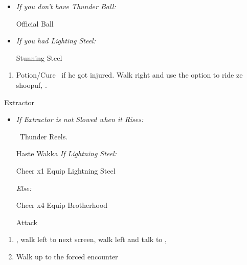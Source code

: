 \begin{equip}
    \begin{itemize}
        \item \textit{If you don't have Thunder Ball:}
        \begin{itemize}
            \wakkaf Official Ball
        \end{itemize}
        \item \textit{If you had Lighting Steel:}
        \begin{itemize}
            \tidusf Stunning Steel
        \end{itemize}
    \end{itemize}
\end{equip}
\begin{enumerate}[resume]
    \item Potion/Cure \tidus\ if he got injured. Walk right and use the  option to ride ze shoopuf, \sd.
\end{enumerate}
\winvfill\lossvfill
\begin{battle}[4000]{Extractor}
    \begin{itemize}
        \tidusf Haste self
        \wakkaf Attack
        \tidusf Attack Extractor until you apply Slow
        \item \textit{If Extractor is not Slowed when it Rises:}
        \begin{itemize}
            \wakkaf \od\ Thunder Reels.
        \end{itemize}
        \tidusf Haste Wakka
        \textit{If Lightning Steel:}
        \begin{itemize}
            \tidusf Cheer x1
            \tidusf Equip Lightning Steel
        \end{itemize}
        \textit{Else:}
        \begin{itemize}
            \tidusf Cheer x4
            \tidusf Equip Brotherhood
        \end{itemize}
        \tidusf Attack
    \end{itemize}
\end{battle}
\begin{enumerate}[resume]
    \item \sd, walk left to next screen, walk left and talk to \rikku, \sd
    \item Walk up to the forced encounter
\end{enumerate}
